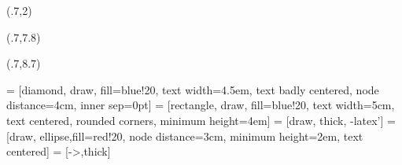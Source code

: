 \usepackage{bm,booktabs,animate,ragged2e,multicol}

\graphicspath{{../figs/}{figs/}}
\def\full#1{\vspace*{0.15cm}\centerline{\texttt{[image: \#1]}}}

\fontsize{13}{15}\sf
\usepackage[scale=0.85]{sourcecodepro}

{
\begin{textblock}{7.5}(.7,2)\fontsize{24}{26}\sf
{\color{white}\raggedright{}\par\inserttitle}
\end{textblock}
\begin{textblock}{7.5}(.7,7.8)
{\fontsize{13}{13}\sf\color{white}\raggedright{\insertauthor}}
\end{textblock}
\begin{textblock}{7.5}(.7,8.7)
{\fontsize{11}{11}\sf\color{DarkYellow}\insertdate}
\end{textblock}
}




\def\E{\text{E}}
\def\V{\text{Var}}
\def\up#1{\raisebox{-0.3cm}{#1}}
\def\pred#1#2#3{\hat{#1}_{#2|#3}}
\def\damped{$_\text{d}$}
\def\h+{h_{m}^{+}}
\def\st#1{\rlap{#1}\textcolor{red}{\rule{1cm}{0.1cm}}}
\def\bY{\bm{y}}
\def\by{\bm{y}}
\def\bS{\bm{S}}
\def\bI{\text{\rm\textbf{I}}}
\def\bbeta{\bm{\beta}}
\def\bSigma{\bm{\Sigma}}
\def\Var{\text{Var}}
\def\var{\text{Var}}
\def\bOmega{\bm{\Omega}}
\def\bLambda{\bm{\Lambda}}
\let\mc\multicolumn
\def\hl{\color[RGB]{230, 172, 0}}



\usepackage{tikz}

\usetikzlibrary{trees,shapes,arrows,matrix}
 = [diamond, draw, fill=blue!20,
    text width=4.5em, text badly centered, node distance=4cm, inner sep=0pt]
 = [rectangle, draw, fill=blue!20,
    text width=5cm, text centered, rounded corners, minimum height=4em]
 = [draw, thick, -latex']
 = [draw, ellipse,fill=red!20, node distance=3cm,
    minimum height=2em, text centered]
 = [->,thick]
